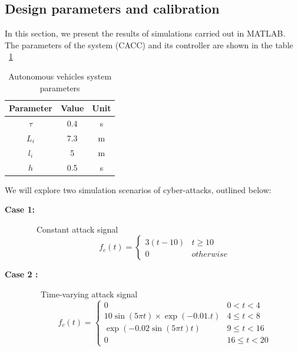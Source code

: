 \documentclass[letterpaper, 10 pt, conference]{ieeeconf}  %
\begin{document}
\subsection{Design parameters and calibration}
{\color{red}In this section, we present the results of simulations carried out in MATLAB. The parameters of the system (CACC) and its controller are shown in the table ~\ref{tab:simple}}\\
\begin{table}[!h]
\centering
\begin{tabular}{|c|c|c|}
\hline
Parameter  & Value  & Unit  \\
\hline
$\tau$ & 0.4 & s \\
$L_{i}$ & 7.3 & m \\
$l_{i}$ & 5 & m \\
$h$ & 0.5 & s \\
\hline
\end{tabular}
\caption{Autonomous vehicles system parameters}
\label{tab:simple}
\end{table}
We will explore two simulation scenarios of cyber-attacks, outlined below: 
\begin{description}
    \item[\textbf{Case 1:}]~~Constant attack signal
\begin{equation}
    f_c(t)=\left\{\begin{array}{lc}
    3(t-10) & t\geq10 \\
    0 & otherwise 
    \end{array}\right.
\end{equation}

\item[\textbf{Case 2 :}]~~~Time-varying attack signal
\begin{equation}
    f_c(t)=\left\{\begin{array}{lc}
    0 & 0<t<4 \\
    10 \sin (5 \pi t)\times \exp(-0.01 . t) & 4 \leq t<8 \\
    \exp(-0.02 \sin (5 \pi t) t) & 9 \leq t<16 \\
    0 & 16 \leq t<20
    \end{array}\right.
\end{equation}
\end{description}
\end{document}
